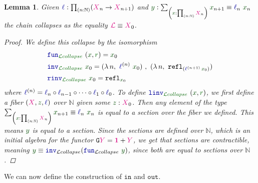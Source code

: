 \documentclass[twoside,11pt,openright]{report}
\theoremstyle{plain} %
\newtheorem{lem}[thm]{Lemma}
\theoremstyle{definition}
\theoremstyle{remark}
\newcommand*{\term}[1]{\textcolor{green!30!black}{#1}} %
\newcommand*{\pathterm}[1]{\textcolor{green!40!black}{#1}}
\newcommand*{\type}[1]{\textcolor{magenta!90!black}{#1}}
\newcommand*{\unit}{\type{\textbf{1}}}
\newcommand*{\function}[1]{\textcolor{blue!60!black}{\ensuremath{\mathtt{#1}}}}
\newcommand*{\functor}[1]{\ensuremath{\mathbf{\mathtt{#1}}}}
\begin{document}
\begin{lem}\label{lem:limit-collapse}
  Given \(\function{\ell} : \prod_{(n : \mathbb{N})} (\type{X}_{n} \rightarrow \type{X}_{n+1})\) and \(\term{y} : \sum_{\left(\term{x} : \prod_{(n : \mathbb{N})} \type{X}_n\right)} \term{x}_{n + 1} \equiv \function{\ell}_n~\term{x}_n\) the chain collapses as the equality \(\type{\mathcal{L}} \equiv \type{X}_0\).
  \begin{proof}
    We define this collapse by the isomorphism
    \begin{align}
      &\function{fun}_{\pathterm{\mathcal{L}collapse}}~(\term{x} , \pathterm{r}) = \term{x}_0 \\
      &\function{inv}_{\pathterm{\mathcal{L}collapse}}~\term{x}_0 = (\lambda\,n,~\function{\ell}^{(n)}~\term{x}_0)~,~(\lambda\,n,~\mathtt{refl}_{(\function{\ell}^{(n+1)}\,\term{x}_0)}) \\
      &\function{rinv}_{\pathterm{\mathcal{L}collapse}}~\term{x}_0 = \mathtt{refl}_{\term{x}_0}
    \end{align}
    where \(\function{\ell}^{(n)} = \function{\ell}_n \circ \function{\ell}_{n-1} \circ \dots \circ \function{\ell}_1 \circ \function{\ell}_0\). To define \(\function{linv}_{\pathterm{\mathcal{L}collapse}}~(\term{x} , \pathterm{r})\), we first define a fiber \((\type{X} , \term{z}, \function{\ell})\) over \(\mathbb{N}\) given some \(\term{z} : \type{X}_0\). Then any element of the type \(\sum_{\left(\term{x} : \prod_{(n : \mathbb{N})} \type{X}_n\right)} \term{x}_{n + 1} \equiv \function{\ell}_n~\term{x}_n\) is equal to a section over the fiber we defined. This means \(\term{y}\) is equal to a section. Since the sections are defined over \(\mathbb{N}\), which is an initial algebra for the functor \(\functor{G}\type{Y} = \unit + \type{Y}\), we get that sections are contractible, meaning \(\term{y} \equiv \function{inv}_{\mathcal{L}collapse} (\function{fun}_{\mathcal{L}collapse}~\term{y})\), since both are equal to sections over \(\mathbb{N}\).
\end{proof}
\end{lem}
\noindent We can now define the construction of \function{in} and \function{out}.
\end{document}
